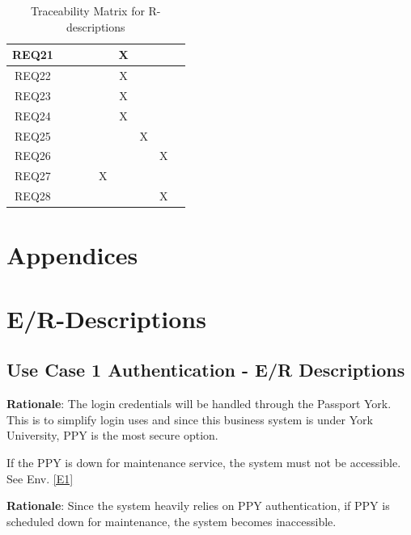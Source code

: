 \documentclass[fontsize=12pt,paper=letter,twoside]{scrartcl}
\begin{document}
\begin{table}[h]
\begin{tabular}{| c | c | c | c | c | c | c | c | c |}
	REQ21 & & & & & X & & & \\ \hline
	REQ22 & & & & & X & & & \\ \hline
	REQ23 & & & & & X & & & \\ \hline
	REQ24 & & & & & X & & & \\ \hline
	REQ25 & & & & & & X & & \\ \hline
	
	REQ26 & & & & & & & X & \\ \hline
	REQ27 & & & & X & & & & \\ \hline
	REQ28 & & & & & & & X & \\ \hline
\end{tabular}
\caption {Traceability Matrix for R-descriptions}
\label{tbl:trace_matrix}
\end{table}


\clearpage
\newpage
\section{Appendices}
\appendix

\section{E/R-Descriptions} \label{r-decs}

\subsection{Use Case 1 Authentication - E/R Descriptions}

\label{E1}

\smallskip
\noindent \textbf{Rationale}: The login credentials will be handled through the Passport York. This is to simplify login uses and since this business system is under York University, PPY is the most secure option.

\edescription
{If the PPY is down for maintenance service, the system must not be accessible.\\}
{See Env. \ref{E1}}
\label{E2}

\smallskip
\noindent \textbf{Rationale}: Since the system heavily relies on PPY authentication, if PPY is scheduled down for maintenance, the system becomes inaccessible.
\end{document}
